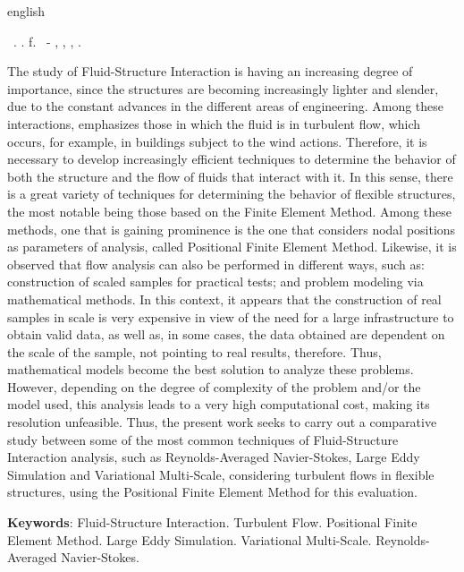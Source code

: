 \begin{resumo}[Abstract]
    \begin{otherlanguage*}{english}
        \begin{flushleft}
            \setlength{\absparsep}{0pt} %
            \SingleSpacing
            \Autorabr\ \textbf{\Title}.	\the\year. \pageref{LastPage}f.
            \Typeofwork\ - \Unidademin, \Universidade, \Local, \the\year.
        \end{flushleft}
        \OnehalfSpacing

        The study of Fluid-Structure Interaction is having an increasing degree of importance, since the structures are becoming increasingly lighter and slender, due to the constant advances in the different areas of engineering. Among these interactions, emphasizes those in which the fluid is in turbulent flow, which occurs, for example, in buildings subject to the wind actions. Therefore, it is necessary to develop increasingly efficient techniques to determine the behavior of both the structure and the flow of fluids that interact with it. In this sense, there is a great variety of techniques for determining the behavior of flexible structures, the most notable being those based on the Finite Element Method. Among these methods, one that is gaining prominence is the one that considers nodal positions as parameters of analysis, called Positional Finite Element Method. Likewise, it is observed that flow analysis can also be performed in different ways, such as: construction of scaled samples for practical tests; and problem modeling via mathematical methods. In this context, it appears that the construction of real samples in scale is very expensive in view of the need for a large infrastructure to obtain valid data, as well as, in some cases, the data obtained are dependent on the scale of the sample, not pointing to real results, therefore. Thus, mathematical models become the best solution to analyze these problems. However, depending on the degree of complexity of the problem and/or the model used, this analysis leads to a very high computational cost, making its resolution unfeasible. Thus, the present work seeks to carry out a comparative study between some of the most common techniques of Fluid-Structure Interaction analysis, such as Reynolds-Averaged Navier-Stokes, Large Eddy Simulation and Variational Multi-Scale, considering turbulent flows in flexible structures, using the Positional Finite Element Method for this evaluation.

        \textbf{Keywords}: Fluid-Structure Interaction. Turbulent Flow. Positional Finite Element Method. Large Eddy Simulation. Variational Multi-Scale. Reynolds-Averaged Navier-Stokes.
    \end{otherlanguage*}
\end{resumo}